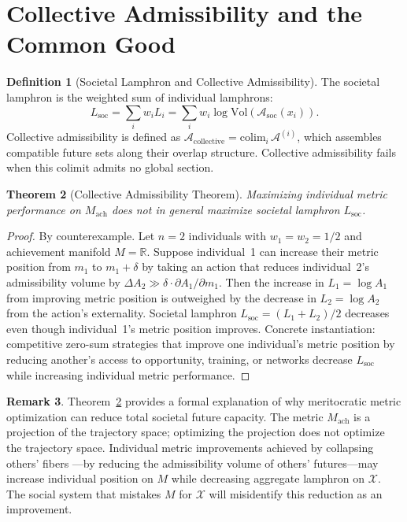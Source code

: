 \documentclass[12pt, oneside]{book}
\theoremstyle{flyxion}
\newtheorem{theorem}{Theorem}[chapter]
\theoremstyle{definition}
\newtheorem{definition}[theorem]{Definition}
\newtheorem{remark}[theorem]{Remark}
\begin{document}
\section{Collective Admissibility and the Common Good}

\begin{definition}[Societal Lamphron and Collective
Admissibility]
The societal lamphron is the weighted sum of
individual lamphrons:
\[
L_\mathrm{soc} = \sum_i w_i L_i
= \sum_i w_i \log\mathrm{Vol}(\mathcal{A}_\mathrm{soc}
(x_i)).
\]
Collective admissibility is defined as
$\mathcal{A}_\mathrm{collective} =
\mathrm{colim}_i\,\mathcal{A}^{(i)}$, which assembles
compatible future sets along their overlap structure.
Collective admissibility fails when this colimit admits
no global section.
\end{definition}

\begin{theorem}[Collective Admissibility Theorem]
\label{thm:collective_admissibility}
Maximizing individual metric performance on
$M_\mathrm{ach}$ does not in general maximize societal
lamphron $L_\mathrm{soc}$.
\end{theorem}

\begin{proof}
By counterexample. Let $n = 2$ individuals with
$w_1 = w_2 = 1/2$ and achievement manifold $M =
\mathbb{R}$. Suppose individual~1 can increase their
metric position from $m_1$ to $m_1 + \delta$ by
taking an action that reduces individual~2's
admissibility volume by $\Delta A_2 \gg \delta \cdot
\partial A_1 / \partial m_1$. Then the increase in
$L_1 = \log A_1$ from improving metric position is
outweighed by the decrease in $L_2 = \log A_2$ from
the action's externality. Societal lamphron
$L_\mathrm{soc} = (L_1 + L_2)/2$ decreases even
though individual~1's metric position improves.
Concrete instantiation: competitive zero-sum strategies
that improve one individual's metric position by
reducing another's access to opportunity, training, or
networks decrease $L_\mathrm{soc}$ while increasing
individual metric performance.
\end{proof}

\begin{remark}
Theorem~\ref{thm:collective_admissibility} provides a
formal explanation of why meritocratic metric
optimization can reduce total societal future capacity.
The metric $M_\mathrm{ach}$ is a projection of the
trajectory space; optimizing the projection does not
optimize the trajectory space. Individual metric
improvements achieved by collapsing others' fibers
---by reducing the admissibility volume of others'
futures---may increase individual position on $M$
while decreasing aggregate lamphron on $\mathcal{X}$.
The social system that mistakes $M$ for $\mathcal{X}$
will misidentify this reduction as an improvement.
\end{remark}
\end{document}

